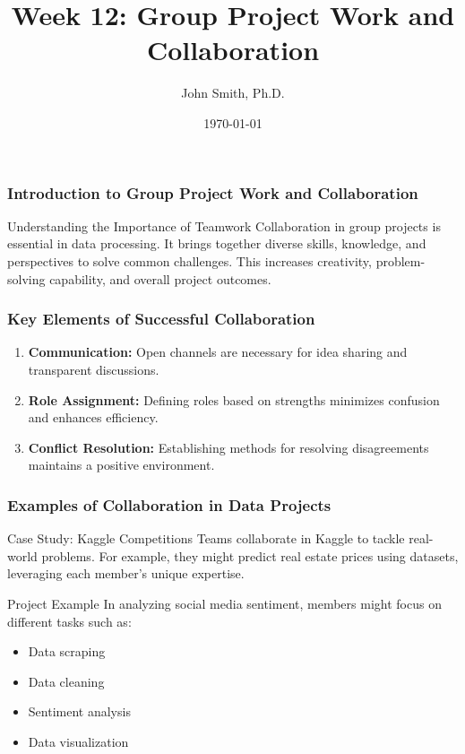 \documentclass[aspectratio=169]{beamer}
\title[Group Project Work]{Week 12: Group Project Work and Collaboration}
\author[J. Smith]{John Smith, Ph.D.}
\institute[University Name]{
  Department of Computer Science\\
  University Name\\
  Email: email@university.edu\\
  Website: www.university.edu
}
\date{\today}
\begin{document}
\frame{\titlepage}

\begin{frame}[fragile]
    \frametitle{Introduction to Group Project Work and Collaboration}
    \begin{block}{Understanding the Importance of Teamwork}
        Collaboration in group projects is essential in data processing. It brings together diverse skills, knowledge, and perspectives to solve common challenges. This increases creativity, problem-solving capability, and overall project outcomes.
    \end{block}
\end{frame}

\begin{frame}[fragile]
    \frametitle{Key Elements of Successful Collaboration}
    \begin{enumerate}
        \item \textbf{Communication:} Open channels are necessary for idea sharing and transparent discussions.
        \item \textbf{Role Assignment:} Defining roles based on strengths minimizes confusion and enhances efficiency.
        \item \textbf{Conflict Resolution:} Establishing methods for resolving disagreements maintains a positive environment.
    \end{enumerate}
\end{frame}

\begin{frame}[fragile]
    \frametitle{Examples of Collaboration in Data Projects}
    \begin{block}{Case Study: Kaggle Competitions}
        Teams collaborate in Kaggle to tackle real-world problems. For example, they might predict real estate prices using datasets, leveraging each member's unique expertise.
    \end{block}

    \begin{block}{Project Example}
        In analyzing social media sentiment, members might focus on different tasks such as:
        \begin{itemize}
            \item Data scraping
            \item Data cleaning
            \item Sentiment analysis
            \item Data visualization
        \end{itemize}
    \end{block}
\end{frame}
\end{document}
